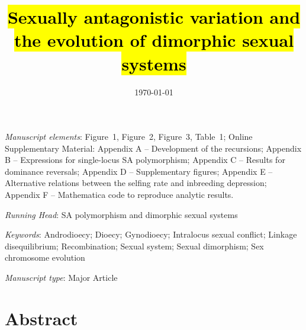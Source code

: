 \documentclass{article}
\title{\hl{Sexually antagonistic variation and the evolution of dimorphic sexual systems}}
\date{\today}
\begin{document}
\maketitle





\bigskip

\noindent{} \textit{Manuscript elements}: Figure~1, Figure~2, Figure~3, Table~1; Online Supplementary Material: Appendix A -- Development of the recursions; Appendix B -- Expressions for single-locus SA polymorphism; Appendix C -- Results for dominance reversals; Appendix D -- Supplementary figures; Appendix E -- Alternative relations between the selfing rate and inbreeding depression; Appendix F -- Mathematica code to reproduce analytic results.

\bigskip
\noindent{} \textit{Running Head}: SA polymorphism and dimorphic sexual systems

\bigskip

\noindent{} \textit{Keywords}: Androdioecy; Dioecy; Gynodioecy; Intralocus sexual conflict; Linkage disequilibrium; Recombination; Sexual system; Sexual dimorphism; Sex chromosome evolution

\bigskip

\noindent{} \textit{Manuscript type}: Major Article

\bigskip


\linenumbers
\modulolinenumbers[1]
\renewcommand\linenumberfont{\normalfont\small}


\newpage{}
\section*{Abstract}
\end{document}
